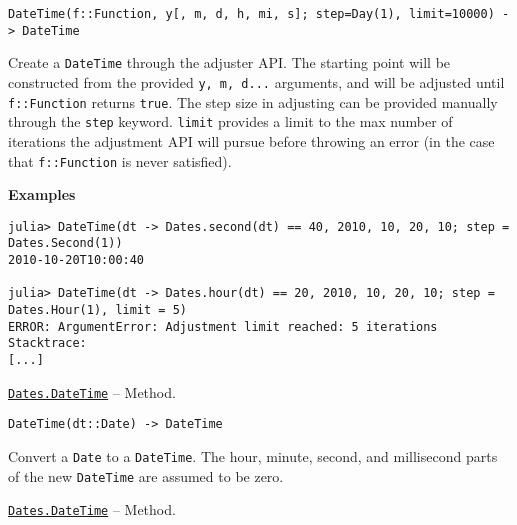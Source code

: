 \begin{adjustwidth}{2em}{0pt}


\begin{verbatim}
DateTime(f::Function, y[, m, d, h, mi, s]; step=Day(1), limit=10000) -> DateTime
\end{verbatim}

Create a \texttt{DateTime} through the adjuster API. The starting point will be constructed from the provided \texttt{y, m, d...} arguments, and will be adjusted until \texttt{f::Function} returns \texttt{true}. The step size in adjusting can be provided manually through the \texttt{step} keyword. \texttt{limit} provides a limit to the max number of iterations the adjustment API will pursue before throwing an error (in the case that \texttt{f::Function} is never satisfied).

\textbf{Examples}


\begin{verbatim}
julia> DateTime(dt -> Dates.second(dt) == 40, 2010, 10, 20, 10; step = Dates.Second(1))
2010-10-20T10:00:40

julia> DateTime(dt -> Dates.hour(dt) == 20, 2010, 10, 20, 10; step = Dates.Hour(1), limit = 5)
ERROR: ArgumentError: Adjustment limit reached: 5 iterations
Stacktrace:
[...]
\end{verbatim}



\end{adjustwidth}
\hypertarget{12066645755218970960}{} 
\hyperlink{12066645755218970960}{\texttt{Dates.DateTime}}  -- {Method.}

\begin{adjustwidth}{2em}{0pt}


\begin{verbatim}
DateTime(dt::Date) -> DateTime
\end{verbatim}

Convert a \texttt{Date} to a \texttt{DateTime}. The hour, minute, second, and millisecond parts of the new \texttt{DateTime} are assumed to be zero.



\end{adjustwidth}
\hypertarget{17944514963000811562}{} 
\hyperlink{17944514963000811562}{\texttt{Dates.DateTime}}  -- {Method.}

